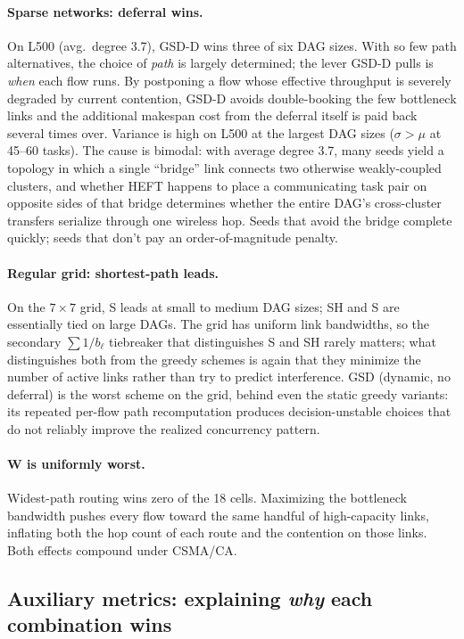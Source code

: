 \documentclass[conference]{IEEEtran}
\begin{document}
\paragraph{Sparse networks: deferral wins.} On L500 (avg.\ degree 3.7),
GSD-D wins three of six DAG sizes. With so few path alternatives, the choice
of \emph{path} is largely determined; the lever GSD-D pulls is \emph{when}
each flow runs. By postponing a flow whose effective throughput is severely
degraded by current contention, GSD-D avoids double-booking the few
bottleneck links and the additional makespan cost from the deferral itself
is paid back several times over. Variance is high on L500 at the largest
DAG sizes ($\sigma>\mu$ at 45--60 tasks). The cause is bimodal: with
average degree 3.7, many seeds yield a topology in which a single
``bridge'' link connects two otherwise weakly-coupled clusters, and
whether HEFT happens to place a communicating task pair on opposite
sides of that bridge determines whether the entire DAG's cross-cluster
transfers serialize through one wireless hop. Seeds that avoid the
bridge complete quickly; seeds that don't pay an order-of-magnitude
penalty.

\paragraph{Regular grid: shortest-path leads.} On the $7\times7$ grid,
S leads at small to medium DAG sizes; SH and S are essentially tied on
large DAGs. The grid has uniform link bandwidths, so the secondary
$\sum 1/b_\ell$ tiebreaker that distinguishes S and SH rarely matters; what
distinguishes both from the greedy schemes is again that they minimize the
number of active links rather than try to predict interference. GSD
(dynamic, no deferral) is the worst scheme on the grid, behind even the
static greedy variants: its repeated per-flow path recomputation produces
decision-unstable choices that do not reliably improve the realized
concurrency pattern.

\paragraph{W is uniformly worst.} Widest-path routing wins zero of the 18
cells. Maximizing the bottleneck bandwidth pushes every flow toward the
same handful of high-capacity links, inflating both the hop count of each
route and the contention on those links. Both effects compound under
CSMA/CA.

\subsection{Auxiliary metrics: explaining \emph{why} each combination wins}
\label{sec:results-metrics}
\end{document}

